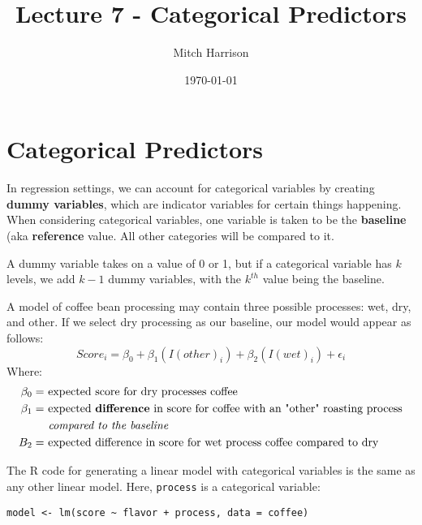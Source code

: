 \documentclass[titlepage, 12pt, leqno]{article}
\title{\Huge{Lecture 7 - Categorical Predictors}}
\author{\large{Mitch Harrison}}
\date{\today}
\begin{document}
\setlength{\parskip}{1\baselineskip}
\setlength{\parindent}{15pt}
\maketitle
\tableofcontents
\newpage


\section{Categorical Predictors}
\begin{definition}
    In regression settings, we can account for categorical variables by creating \textbf{dummy variables}, which are indicator variables for certain things happening. \\[.1in]
    When considering categorical variables, one variable is taken to be the \textbf{baseline} (aka \textbf{reference} value. All other categories will be compared to it.
\end{definition}

A dummy variable takes on a value of 0 or 1, but if a categorical variable has $k$ levels, we add $k-1$ dummy variables, with the $k^{th}$ value being the baseline.
\begin{ex}
    A model of coffee bean processing may contain three possible processes: wet, dry, and other. If we select dry processing as our baseline, our model would appear as follows:
    \[
    \boxed{Score_i = \beta_0 + \beta_1(I(other)_i) + \beta_2(I(wet)_i)+\epsilon_i} 
    \]
Where:
\begin{align*}
    \beta_0 = &\text{ expected score for dry processes coffee}\\
    \beta_1 = &\text{ expected \textbf{difference} in score for coffee with an "other" roasting process} \\
            &\textit{ compared to the baseline} \\
    B_2 = &\text{ expected difference in score for wet process coffee compared to dry}
\end{align*}
\end{ex}

The R code for generating a linear model with categorical variables is the same as any other linear model. Here, \texttt{process} is a categorical variable:
\begin{verbatim}
model <- lm(score ~ flavor + process, data = coffee)
\end{verbatim}
\end{document}

